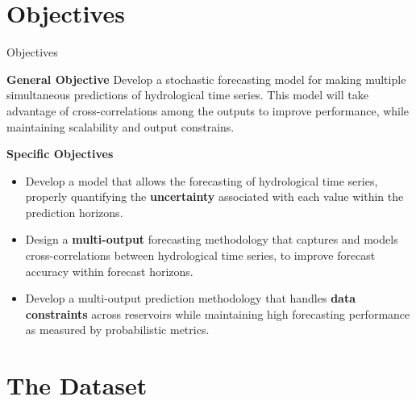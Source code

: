 \section*{Objectives}

\begin{frame}{Objectives}
	\begin{block}{\textbf{General Objective}}
			Develop a stochastic forecasting model for making multiple simultaneous predictions of hydrological time series. This model will take advantage of cross-correlations among the outputs to improve performance, while maintaining scalability  and output constrains.
	\end{block}
	
	\begin{block}{\textbf{Specific Objectives}}
			
			\begin{itemize}
			\item Develop a model that allows the forecasting of hydrological time series, properly quantifying the \textcolor{myNewColorB}{\textbf{uncertainty}} associated with each value within the prediction horizons.
			\item  Design a \textcolor{myNewColorB}{\textbf{multi-output}} forecasting methodology that captures and models cross-correlations between hydrological time series, to improve forecast accuracy within forecast horizons.
			\item Develop a multi-output prediction methodology that handles \textcolor{myNewColorB}{\textbf{data constraints}} across reservoirs while maintaining high forecasting performance as measured by probabilistic metrics.
		\end{itemize}
	\end{block}
\end{frame}

\section*{The Dataset}

